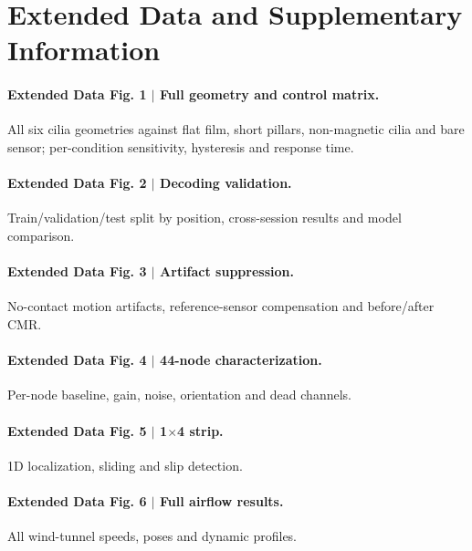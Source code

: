 \section*{Extended Data and Supplementary Information}

\paragraph{Extended Data Fig. 1 $\vert$ Full geometry and control matrix.}
All six cilia geometries against flat film, short pillars, non-magnetic cilia
and bare sensor; per-condition sensitivity, hysteresis and response time.

\paragraph{Extended Data Fig. 2 $\vert$ Decoding validation.}
Train/validation/test split by position, cross-session results and model
comparison. 

\paragraph{Extended Data Fig. 3 $\vert$ Artifact suppression.}
No-contact motion artifacts, reference-sensor compensation and before/after CMR.

\paragraph{Extended Data Fig. 4 $\vert$ 44-node characterization.}
Per-node baseline, gain, noise, orientation and dead channels.

\paragraph{Extended Data Fig. 5 $\vert$ 1$\times$4 strip.}
1D localization, sliding and slip detection. 

\paragraph{Extended Data Fig. 6 $\vert$ Full airflow results.}
All wind-tunnel speeds, poses and dynamic profiles. 

